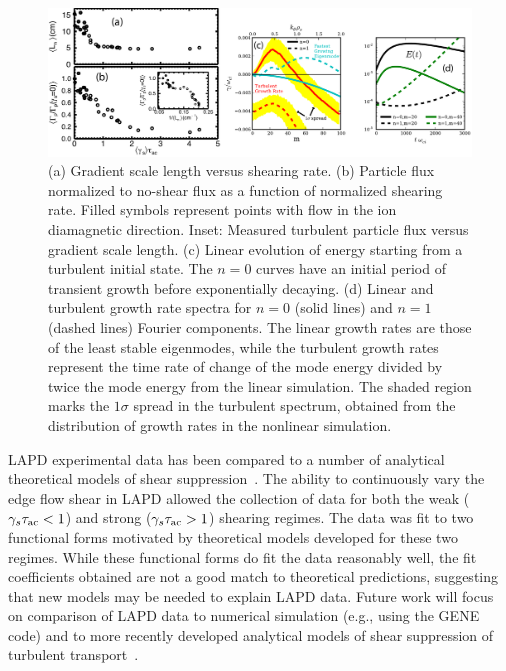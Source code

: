 \documentclass[11pt]{article}
\renewcommand{\cite}{\citep}
\begin{document}
\begin{figure}[!htbp]
\centerline{
\includegraphics[width=6.2truein]{rotation}}
\caption{\small \label{rotation} (a) Gradient scale length versus shearing
  rate. (b) Particle flux normalized to no-shear
  flux as a function of normalized shearing rate. Filled symbols
  represent points with flow in the ion diamagnetic direction. Inset: Measured turbulent particle flux versus
  gradient scale length. (c) Linear evolution of energy starting from a turbulent initial state. The $n = 0$ curves have an initial period
of transient growth before exponentially decaying. (d) Linear and turbulent growth rate spectra for $n = 0$ (solid lines)
and $n = 1$ (dashed lines) Fourier components. The linear
growth rates are those of the least stable eigenmodes, while
the turbulent growth rates represent the time rate of change of the
mode energy divided by twice the mode energy from the 
linear simulation. The shaded region marks the $1\sigma$ spread in the
turbulent spectrum, obtained from the distribution of growth rates in
the nonlinear simulation.
}
\end{figure}


LAPD experimental data has been compared to a number of analytical theoretical models of shear
suppression~\cite{schaffner:2013}.   The ability to continuously vary
the edge flow shear in LAPD allowed the collection of data for both
the weak ($\gamma_s \tau_{\rm ac} < 1$) and strong ($\gamma_s
\tau_{\rm ac} > 1$) shearing regimes.  The data was fit to two
functional forms motivated by theoretical models developed for these
two regimes.  While these functional forms do fit the data reasonably
well, the fit coefficients obtained are not a good match to
theoretical predictions, suggesting that new models may be needed to
explain LAPD data.  Future work will focus on comparison of LAPD data
to numerical simulation (e.g., using the GENE code) and to more
recently developed analytical models of shear suppression of turbulent
transport~\cite{staebler:2013}.
\end{document}
